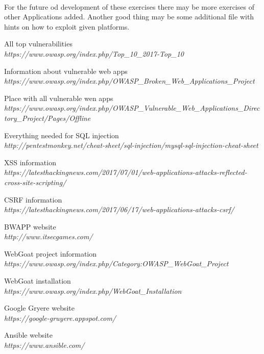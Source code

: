 \documentclass[12pt, a4paper]{article}
\begin{document}
\paragraph{}For the future od development of these exercises there may be more exercises of other Applications added. Another good thing may be some additional file with hints on how to exploit given platforms.


\newpage{}
\listoffigures

\begin{thebibliography}{9}
\bibitem{} All top vulnerabilities\\
\textit{https://www.owasp.org/index.php/Top\_10\_2017-Top\_10}

\bibitem{} Information about vulnerable web apps\\
\textit{https://www.owasp.org/index.php/OWASP\_Broken\_Web\_Applications\_Project}

\bibitem{} Place with all vulnerable wen apps\\
\textit{https://www.owasp.org/index.php/OWASP\_Vulnerable\_Web\_Applications\_Directory\_Project/Pages/Offline}

\bibitem{} Everything needed for SQL injection\\
\textit{http://pentestmonkey.net/cheat-sheet/sql-injection/mysql-sql-injection-cheat-sheet}

\bibitem{} XSS information\\
\textit{https://latesthackingnews.com/2017/07/01/web-applications-attacks-reflected-cross-site-scripting/}

\bibitem{} CSRF information\\
\textit{https://latesthackingnews.com/2017/06/17/web-applications-attacks-csrf/}

\bibitem{} BWAPP website\\
\textit{http://www.itsecgames.com/}

\bibitem{} WebGoat project information\\
\textit{https://www.owasp.org/index.php/Category:OWASP\_WebGoat\_Project}

\bibitem{} WebGoat installation\\
\textit{https://www.owasp.org/index.php/WebGoat\_Installation}

\bibitem{} Google Gryere website\\
\textit{https://google-gruyere.appspot.com/}

\bibitem{} Ansible website\\
\textit{https://www.ansible.com/}


\end{thebibliography}
\end{document}
